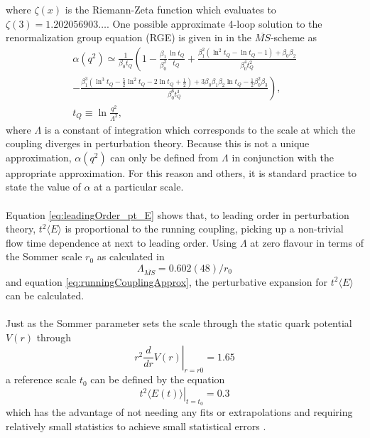 \documentclass[a4paper,10pt]{article}
\begin{document}
where $\zeta(x)$ is the Riemann-Zeta function which evaluates to $\zeta(3) = 1.202056903 \ldots$. One possible approximate 4-loop solution to the renormalization group equation (RGE) is given in \cite{AgasheK2016ROPP} in the $\overline{MS}$-scheme as
\begin{equation}\label{eq:runningCouplingApprox}
\begin{gathered}
\alpha\left(q^{2}\right) \simeq \frac{1}{\beta_{0} t_Q}\left(1-\frac{\beta_{1}}{\beta_{0}^{2}} \frac{\ln t_Q}{t_Q}+\frac{\beta_{1}^{2}\left(\ln ^{2} t_Q-\ln t_Q-1\right)+\beta_{0} \beta_{2}}{\beta_{0}^{4} t_Q^{2}}\right. \\
\left.-\frac{\beta_{1}^{3}\left(\ln ^{3} t_Q-\frac{5}{2} \ln ^{2} t_Q-2 \ln t_Q+\frac{1}{2}\right)+3 \beta_{0} \beta_{1} \beta_{2} \ln t_Q-\frac{1}{2} \beta_{0}^{2} \beta_{3}}{\beta_{0}^{6} t_Q^{3}}\right), \\
t_Q \equiv \ln \frac{q^{2}}{\Lambda^{2}},
\end{gathered}
\end{equation}
where $\Lambda$ is a constant of integration which corresponds to the scale at which the coupling diverges in perturbation theory. Because this is not a unique approximation, $\alpha\left(q^{2}\right)$ can only be defined from $\Lambda$ in conjunction with the appropriate approximation. For this reason and others, it is standard practice to state the value of $\alpha$ at a particular scale.\\\\Equation \eqref{eq:leadingOrder_pt_E} shows that, to leading order in perturbation theory, $t^{2}\langle E\rangle$ is proportional to the running coupling, picking up a non-trivial flow time dependence at next to leading order. Using $\Lambda$ at zero flavour in terms of the Sommer scale $r_0$ as calculated in \cite{CapitaniStefano1999Nqmr}
\begin{equation}
\Lambda_{\overline{MS}}=0.602(48) / r_{0}
\end{equation}
and equation \eqref{eq:runningCouplingApprox}, the perturbative expansion for $t^2\langle E \rangle$ can be calculated.\\\\Just as the Sommer parameter sets the scale through the static quark potential $V(r)$ through
\begin{equation}
r^2\left.\frac{d}{d r} V(r)\right|_{r=r0} = 1.65
\end{equation}
a reference scale $t_0$ can be defined by the equation
\begin{equation}
\left.t^{2}\langle E(t)\rangle\right|_{t=t_{0}}=0.3
\end{equation}
which has the advantage of not needing any fits or extrapolations and requiring relatively small statistics to achieve small statistical errors \cite{Luscher2010}.
\end{document}
